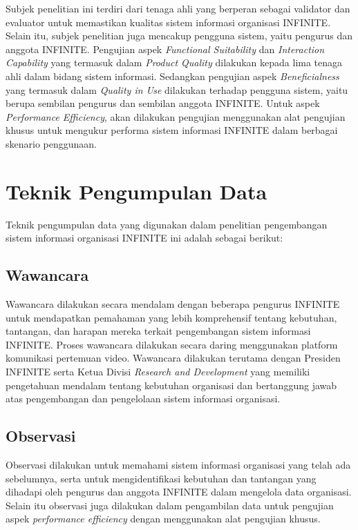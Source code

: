 Subjek penelitian ini terdiri dari tenaga ahli yang berperan sebagai validator dan evaluator untuk memastikan kualitas sistem informasi organisasi INFINITE. Selain itu, subjek penelitian juga mencakup pengguna sistem, yaitu pengurus dan anggota INFINITE. Pengujian aspek \textit{Functional Suitability} dan \textit{Interaction Capability} yang termasuk dalam \textit{Product Quality} dilakukan kepada lima tenaga ahli dalam bidang sistem informasi. Sedangkan pengujian aspek \textit{Beneficialness} yang termasuk dalam \textit{Quality in Use} dilakukan terhadap pengguna sistem, yaitu berupa sembilan pengurus dan sembilan anggota INFINITE. Untuk aspek \textit{Performance Efficiency}, akan dilakukan pengujian menggunakan alat pengujian khusus untuk mengukur performa sistem informasi INFINITE dalam berbagai skenario penggunaan.

\section{Teknik Pengumpulan Data}

Teknik pengumpulan data yang digunakan dalam penelitian pengembangan sistem informasi organisasi INFINITE ini adalah sebagai berikut:

\subsection{Wawancara}

Wawancara dilakukan secara mendalam dengan beberapa pengurus INFINITE untuk mendapatkan pemahaman yang lebih komprehensif tentang kebutuhan, tantangan, dan harapan mereka terkait pengembangan sistem informasi INFINITE. Proses wawancara dilakukan secara daring menggunakan platform komunikasi pertemuan video. Wawancara dilakukan terutama dengan Presiden INFINITE serta Ketua Divisi \textit{Research and Development} yang memiliki pengetahuan mendalam tentang kebutuhan organisasi dan bertanggung jawab atas pengembangan dan pengelolaan sistem informasi organisasi.

\subsection{Observasi}

Observasi dilakukan untuk memahami sistem informasi organisasi yang telah ada sebelumnya, serta untuk mengidentifikasi kebutuhan dan tantangan yang dihadapi oleh pengurus dan anggota INFINITE dalam mengelola data organisasi. Selain itu observasi juga dilakukan dalam pengambilan data untuk pengujian aspek \textit{performance efficiency} dengan menggunakan alat pengujian khusus.

